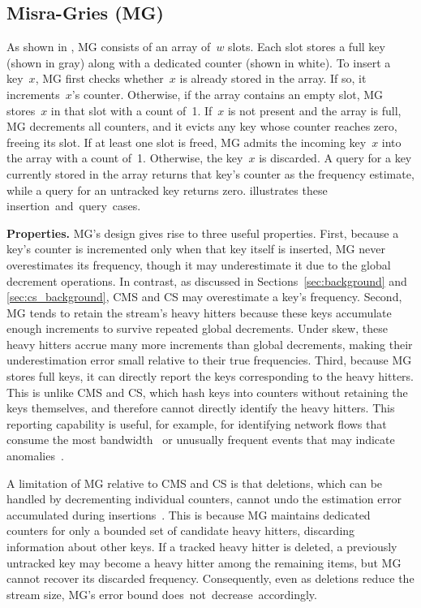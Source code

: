 \documentclass[sigconf]{acmart}
\begin{document}
\subsection{Misra-Gries (MG)}\label{sec:mg_background}
As shown in , MG consists of an array of~$w$ slots.
Each slot stores a full key (shown in gray) along with a dedicated counter (shown in white).
To insert a key~$x$, MG first checks whether~$x$ is already stored in the array.
If so, it increments~$x$'s counter.
Otherwise, if the array contains an empty slot, MG stores~$x$ in that slot with a count of~1.
If~$x$ is not present and the array is full, MG decrements all counters, and it evicts any key whose counter reaches zero, freeing its slot.
If at least one slot is freed, MG admits the incoming key~$x$ into the array with a count of~1.
Otherwise, the key~$x$ is discarded.
A query for a key currently stored in the array returns that key's counter as the frequency estimate, while a query for an untracked key returns zero.
 illustrates these \mbox{insertion and query cases}.

\textbf{Properties.}
MG's design gives rise to three useful properties.
First, because a key's counter is incremented only when that key itself is inserted, MG never overestimates its frequency, though it may underestimate it due to the global decrement operations.
In contrast, as discussed in Sections~\ref{sec:background} and \ref{sec:cs_background}, CMS and CS may overestimate a key's frequency.
Second, MG tends to retain the stream's heavy hitters because these keys accumulate enough increments to survive repeated global decrements.
Under skew, these heavy hitters accrue many more increments than global decrements, making their underestimation error small relative to their true frequencies.
Third, because MG stores full keys, it can directly report the keys corresponding to the heavy hitters.
This is unlike CMS and CS, which hash keys into counters without retaining the keys themselves, and therefore cannot directly identify the heavy hitters.
This reporting capability is useful, for example, for identifying network flows that consume the most bandwidth~\cite{HeavyGuardian,HeavyKeeper,WavingSketch} or unusually frequent events that may indicate anomalies~\cite{NetworkAnomalyDetection1,NetworkAnomalyDetection2}.

A limitation of MG relative to CMS and CS is that deletions, which can be handled by decrementing individual counters, cannot undo the estimation error accumulated during insertions~\cite{BatchUpdateMisraGries,SpaceSavingBoundedDeletes}.
This is because MG maintains dedicated counters for only a bounded set of candidate heavy hitters, discarding information about other keys.
If a tracked heavy hitter is deleted, a previously untracked key may become a heavy hitter among the remaining items, but MG cannot recover its discarded frequency.
Consequently, even as deletions reduce the stream size, MG's error bound \mbox{does not decrease accordingly}.
\end{document}
